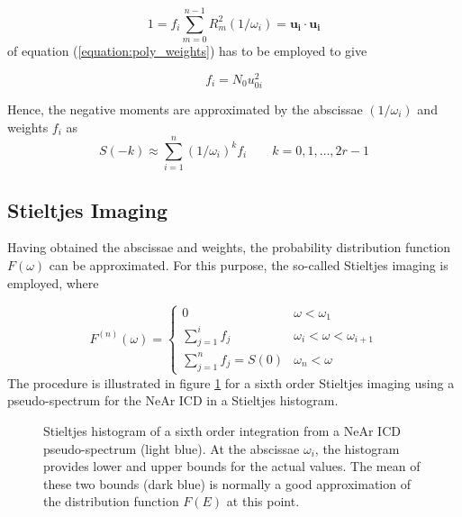 \begin{equation}
  1 = f_i \sum\limits_{m=0}^{n-1} R_m^2 (1/\omega_i) = \mathbf{u_i} \cdot \mathbf{u_i}
\end{equation}
of equation (\ref{equation:poly_weights}) has to be employed to give

\begin{equation}
  f_i = N_0 u_{0i}^2 
\end{equation}

Hence, the negative moments are approximated by the abscissae $(1/\omega_i)$ and
weights $f_i$ as
\begin{equation}
  S(-k) \approx \sum\limits_{i=1}^n (1/\omega_i)^k  f_i \quad\quad k=0,1,\dots,2r-1 
\end{equation}





\subsection{Stieltjes Imaging}
Having obtained the abscissae and weights, the probability distribution function
$F(\omega)$ can be approximated. For this purpose, the so-called Stieltjes imaging
is employed, where

\begin{equation}
  F^{(n)} (\omega) =
  \begin{cases}
    0                                & \omega < \omega_1\\
    \sum\limits_{j=1}^{i} f_j        & \omega_i < \omega < \omega_{i+1}\\
    \sum\limits_{j=1}^{n} f_j = S(0) & \omega_n < \omega 
  \end{cases}
\end{equation}
The procedure is illustrated in figure \ref{figure:stieltjes_imaging} for a sixth
order Stieltjes imaging using a pseudo-spectrum for the NeAr ICD in a
Stieltjes histogram.


\begin{figure}[h]
  \centering
  
  \caption{Stieltjes histogram of a sixth order integration from
           a NeAr ICD pseudo-spectrum (light blue). At the abscissae $\omega_i$,
           the histogram provides lower and upper bounds for the actual
           values. The mean of these two bounds (dark blue) is normally a good
           approximation of the distribution function $F(E)$ at this point.}
  \label{figure:stieltjes_imaging}
\end{figure}

